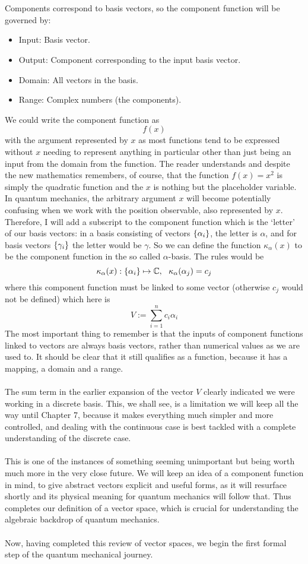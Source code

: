 \\\\
Components correspond to basis vectors, so the component function will be governed by:
\begin{itemize}
    \item Input: Basis vector.
    \item Output: Component corresponding to the input basis vector.
    \item Domain: All vectors in the basis.
    \item Range: Complex numbers (the components).
\end{itemize}
We could write the component function as 
$$
f(x) 
$$
with the argument represented by $x$ as most functions tend to be expressed without $x$ needing to represent anything in particular other than just being an input from the domain from the function. The reader understands and despite the new mathematics remembers, of course, that the function $f(x)=x^2$ is simply the quadratic function and the $x$ is nothing but the placeholder variable. In quantum mechanics, the arbitrary argument $x$ will become potentially confusing when we work with the position observable, also represented by $x$. Therefore, I will add a subscript to the component function which is the `letter' of our basis vectors: in a basis consisting of vectors $\{\alpha_{i}\}$, the letter is $\alpha$, and for basis vectors $\{\gamma_{i}\}$ the letter would be $\gamma$. So we can define the function $\kappa_{\alpha}(x)$ to be the component function in the so called $\alpha$-basis. The rules would be 
$$
\kappa_{\alpha}(x):\{\alpha_{i}\}\mapsto\mathbb{C},\:\:\: \kappa_{\alpha}(\alpha_{j})=c_{j}
$$
where this component function must be linked to some vector (otherwise $c_{j}$ would not be defined) which here is
$$
V:=\sum_{i=1}^{n}c_{i}\alpha_{i}
$$
The most important thing to remember is that the inputs of component functions linked to vectors are always basis vectors, rather than numerical values as we are used to. It should be clear that it still qualifies as a function, because it has a mapping, a domain and a range.
\\\\
The sum term in the earlier expansion of the vector $V$ clearly indicated we were working in a discrete basis. This, we shall see, is a limitation we will keep all the way until Chapter 7, because it makes everything much simpler and more controlled, and dealing with the continuous case is best tackled with a complete understanding of the discrete case.
\\\\
This is one of the instances of something seeming unimportant but being worth much more in the very close future. We will keep an idea of a component function in mind, to give abstract vectors explicit and useful forms, as it will resurface shortly and its physical meaning for quantum mechanics will follow that. Thus completes our definition of a vector space, which is crucial for understanding the algebraic backdrop of quantum mechanics. 
\\\\
Now, having completed this review of vector spaces, we begin the first formal step of the quantum mechanical journey.
